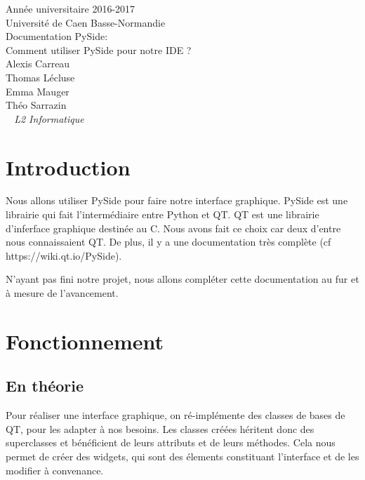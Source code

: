 \documentclass[a4paper,12pt]{article}
\begin{document}
\begin{titlepage}
	\begin{center}
		\Large{Année universitaire 2016-2017}\\
		\Large{Université de Caen Basse-Normandie}\\[1cm]
		
		\huge{Documentation PySide:}\\
		Comment utiliser PySide pour notre IDE ?\\
		\vspace{3cm}
		Alexis Carreau\\
		Thomas Lécluse\\
		Emma Mauger\\
		Théo Sarrazin\\
	\normalsize{\textit{ ~ L2 Informatique}}\\
		\medskip
		\vspace{2cm}
		
	\end{center}
\end{titlepage}

\tableofcontents

\newpage

\section{Introduction}

Nous allons utiliser PySide pour faire notre interface graphique. PySide est une librairie qui fait l'intermédiaire entre Python et QT. QT est une librairie d'inferface graphique destinée au C. Nous avons fait ce choix car deux d'entre nous connaissaient QT. De plus, il y a une documentation très complète (cf https://wiki.qt.io/PySide). 

N'ayant pas fini notre projet, nous allons compléter cette documentation au fur et à mesure de l'avancement.

\section{Fonctionnement}

	\subsection{En théorie}

		Pour réaliser une interface graphique, on ré-implémente des classes de bases de QT, pour les adapter à nos besoins. Les classes créées héritent donc des superclasses et bénéficient de leurs attributs et de leurs méthodes. Cela nous permet de créer des widgets, qui sont des élements constituant l'interface et de les modifier à convenance.
\end{document}
